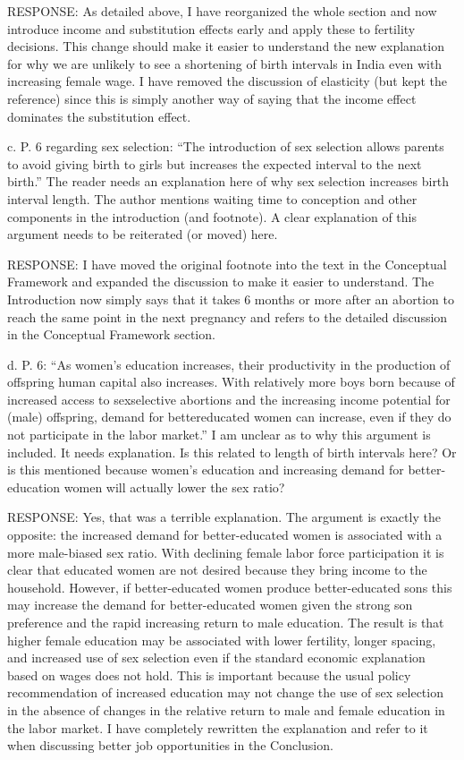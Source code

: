 \documentclass[letterpaper,12pt]{article}
\begin{document}
RESPONSE: As detailed above, I have reorganized the whole section and now introduce income
and substitution effects early and apply these to fertility decisions.
This change should make it easier to understand the new explanation for why we are unlikely
to see a shortening of birth intervals in India even with increasing female wage.
I have removed the discussion of elasticity (but kept the reference) since this is simply
another way of saying that the income effect dominates the substitution effect.

c. P. 6 regarding sex selection: “The introduction of sex selection allows parents to avoid
giving birth to girls but increases the expected interval to the next birth.” The reader
needs an explanation here of why sex selection increases birth interval length. The author
mentions waiting time to conception and other components in the introduction (and
footnote). A clear explanation of this argument needs to be reiterated (or moved) here.

RESPONSE: I have moved the original footnote into the text in the Conceptual Framework and
expanded the discussion to make it easier to understand.
The Introduction now simply says that it takes 6 months or more after an abortion to reach 
the same point in the next pregnancy and refers to the detailed discussion in the
Conceptual Framework section.

d. P. 6: “As women’s education increases, their productivity in the production of offspring
human capital also increases. With relatively more boys born because of increased access to
sexselective abortions and the increasing income potential for (male) offspring, demand for
bettereducated women can increase, even if they do not participate in the labor market.” I
am unclear as to why this argument is included. It needs explanation. Is this related to
length of birth intervals here? Or is this mentioned because women’s education and
increasing demand for better-education women will actually lower the sex ratio?

RESPONSE: Yes, that was a terrible explanation.
The argument is exactly the opposite: the increased demand for better-educated women
is associated with a more male-biased sex ratio.
With declining female labor force participation it is clear that educated women are not
desired because they bring income to the household.
However, if better-educated women produce better-educated sons this may increase the
demand for better-educated women given the strong son preference and the rapid increasing 
return to male education.
The result is that higher female education may be associated with lower fertility, longer 
spacing, and increased use of sex selection even if the standard economic explanation
based on wages does not hold.
This is important because the usual policy recommendation of increased education may
not change the use of sex selection in the absence of changes in the relative return
to male and female education in the labor market.
I have completely rewritten the explanation and refer to it when discussing better
job opportunities in the Conclusion.
\end{document}
